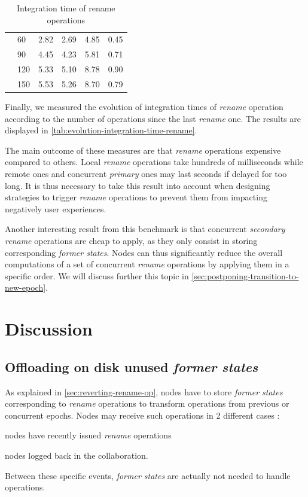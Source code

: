 \documentclass[sigplan,10pt]{acmart}
\begin{document}
\begin{table}[ht!]
{\begin{tabular}{llrrrr}
                                    & 60  &     2.82 &     2.69 &       4.85 &   0.45 \\
                                    & 90  &     4.45 &     4.23 &       5.81 &   0.71 \\
                                    & 120 &     5.33 &     5.10 &       8.78 &   0.90 \\
                                    & 150 &     5.53 &     5.26 &       8.70 &   0.79 \\
            \bottomrule
        \end{tabular}
    }
    \caption{Integration time of rename operations}
    \label{tab:evolution-integration-time-rename}
\end{table}

Finally, we measured the evolution of integration times of \emph{rename} operation according to the number of operations since the last \emph{rename} one.
The results are displayed in \autoref{tab:evolution-integration-time-rename}.

The main outcome of these measures are that \emph{rename} operations expensive compared to others.
Local \emph{rename} operations take hundreds of milliseconds while remote ones and concurrent \emph{primary} ones may last seconds if delayed for too long.
It is thus necessary to take this result into account when designing strategies to trigger \emph{rename} operations to prevent them from impacting negatively user experiences.

Another interesting result from this benchmark is that concurrent \emph{secondary rename} operations are cheap to apply, as they only consist in storing corresponding \emph{former states}.
Nodes can thus significantly reduce the overall computations of a set of concurrent \emph{rename} operations by applying them in a specific order.
We will discuss further this topic in \autoref{sec:postponing-transition-to-new-epoch}.

\section{Discussion}

\subsection{Offloading on disk unused \emph{former states}}
\label{sec:offloading-former-states}

As explained in \autoref{sec:reverting-rename-op}, nodes have to store \emph{former states} corresponding to \emph{rename} operations to transform operations from previous or concurrent epochs.
Nodes may receive such operations in 2 different cases :
\begin{enumerate*}[label=(\roman*)]
    \item nodes have recently issued \emph{rename} operations
    \item nodes logged back in the collaboration.
\end{enumerate*}
Between these specific events, \emph{former states} are actually not needed to handle operations.
\end{document}
